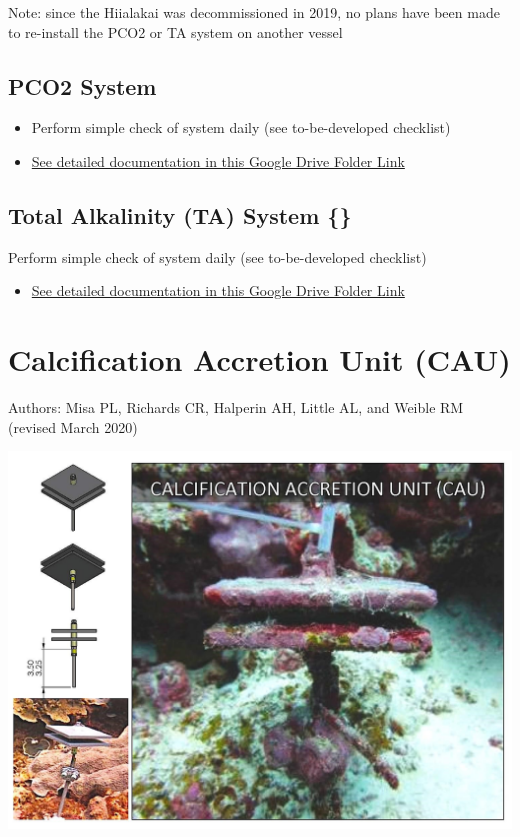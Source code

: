 \documentclass[
]{book}
\providecommand{\tightlist}{%
  \setlength{\itemsep}{0pt}\setlength{\parskip}{0pt}}
\begin{document}
Note: since the Hiialakai was decommissioned in 2019, no plans have been made to re-install the PCO2 or TA system on another vessel

\hypertarget{pco2}{%
\section{PCO2 System}\label{pco2}}

\begin{itemize}
\tightlist
\item
  Perform simple check of system daily (see to-be-developed checklist)
\item
  \href{https://drive.google.com/drive/folders/1p-Evjb3zrw4Kk460knsl4rI4m2Un_jyy}{See detailed documentation in this Google Drive Folder Link}
\end{itemize}

\hypertarget{total-alkalinity-ta-system-ta}{%
\section{\texorpdfstring{Total Alkalinity (TA) System \{\citet{ta}\}}{Total Alkalinity (TA) System \{@ta\}}}\label{total-alkalinity-ta-system-ta}}

Perform simple check of system daily (see to-be-developed checklist)

\begin{itemize}
\tightlist
\item
  \href{https://drive.google.com/drive/folders/1p-Evjb3zrw4Kk460knsl4rI4m2Un_jyy}{See detailed documentation in this Google Drive Folder Link}
\end{itemize}

\hypertarget{calcification-accretion-unit-cau}{%
\chapter{Calcification Accretion Unit (CAU)}\label{calcification-accretion-unit-cau}}

Authors: Misa PL, Richards CR, Halperin AH, Little AL, and Weible RM (revised March 2020)

\includegraphics{images/CAU.jpg}
\end{document}
